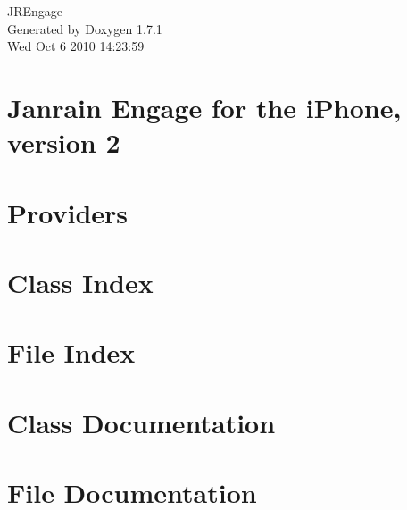 \documentclass[a4paper]{book}
\begin{document}
\hypersetup{pageanchor=false}
\begin{titlepage}
\vspace*{7cm}
\begin{center}
{\Large JREngage }\\
\vspace*{1cm}
{\large Generated by Doxygen 1.7.1}\\
\vspace*{0.5cm}
{\small Wed Oct 6 2010 14:23:59}\\
\end{center}
\end{titlepage}
\clearemptydoublepage
{}
\tableofcontents
\clearemptydoublepage
{}
\hypersetup{pageanchor=true}
\chapter{Janrain Engage for the iPhone, version 2}
\label{index}\hypertarget{index}{}
\chapter{Providers}
\label{Providers}
\hypertarget{Providers}{}

\chapter{Class Index}

\chapter{File Index}

\chapter{Class Documentation}







\chapter{File Documentation}

\printindex
\end{document}
